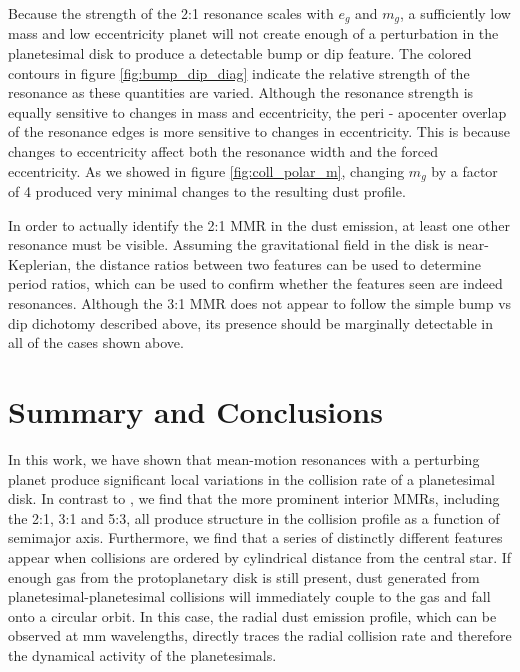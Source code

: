 \documentclass[twocolumn]{aastex63}
\begin{document}
Because the strength of the 2:1 resonance scales with $e_{g}$ and  $m_{g}$, a sufficiently low mass and low eccentricity planet will not create 
enough of a perturbation in the planetesimal disk to produce a detectable bump or dip feature. The colored contours in figure \ref{fig:bump_dip_diag} 
indicate the relative strength of the resonance as these quantities are varied. Although the resonance strength is equally sensitive to changes in 
mass and eccentricity, the peri - apocenter overlap of the resonance edges is more sensitive to changes in eccentricity. This is because changes to 
eccentricity affect both the resonance width and the forced eccentricity. As we showed in figure \ref{fig:coll_polar_m}, changing $m_{g}$ by a factor 
of 4 produced very minimal changes to the resulting dust profile.

In order to actually identify the 2:1 MMR in the dust emission, at least one other resonance must be visible. Assuming the gravitational field in the 
disk is near-Keplerian, the distance ratios between two features can be used to determine period ratios, which can be used to confirm whether the 
features seen are indeed resonances. Although the 3:1 MMR does not appear to follow the simple bump vs dip dichotomy described above, its 
presence should be marginally detectable in all of the cases shown above.

\section{Summary and Conclusions}\label{sec:conclusions}

In this work, we have shown that mean-motion resonances with a perturbing planet produce significant local variations in the collision rate of a 
planetesimal disk. In contrast to \citet{2000Icar..143...45R}, we find that the more prominent interior MMRs, including the 2:1, 3:1 and 5:3, all 
produce structure in the collision profile as a function of semimajor axis. Furthermore, we find that a series of distinctly different features appear 
when collisions are ordered by cylindrical distance from the central star. If enough gas from the protoplanetary disk is still present, dust generated 
from planetesimal-planetesimal collisions will immediately couple to the gas and fall onto a circular orbit. In this case, the radial dust emission profile, 
which can be observed at mm wavelengths, directly traces the radial collision rate and therefore the dynamical activity of the planetesimals.
\end{document}
